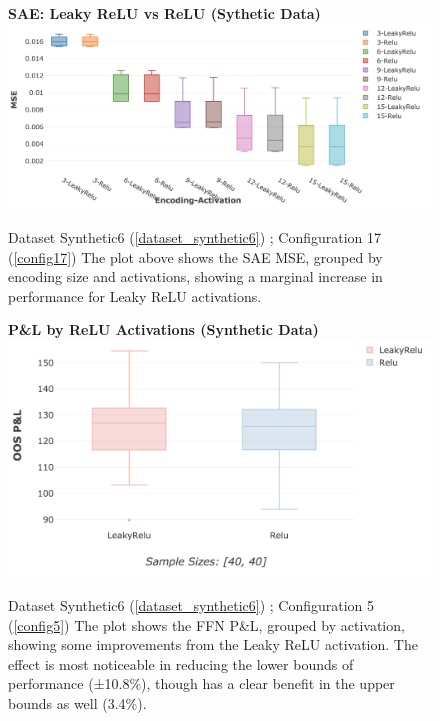 \documentclass[a4paper,11pt,oneside]{article}
\theoremstyle{plain}
\theoremstyle{definition}
\begin{document}
	\begin{figure}[H]
		\centering 
		\textbf{SAE: Leaky ReLU vs ReLU (Sythetic Data)} 
		\includegraphics[scale=0.4]{images/results/8_appendix/synthetic_mse_leakyrelu.png}
		\caption[SAE: Leaky ReLU vs. ReLU (Synthetic Data)]{Dataset Synthetic6  (\ref{dataset_synthetic6}) ; Configuration 17 (\ref{config17})
			\newline The plot above shows the SAE MSE, grouped by encoding size and activations, showing a marginal increase in performance for Leaky ReLU activations. }
		\label{figure-synthetic_mse_leakyrelu}
	\end{figure}
	
	\begin{figure}[H]
		\textbf{P\&L by ReLU Activations (Synthetic Data)}
		\centering
		\includegraphics[scale=0.4]{images/results/8_appendix/synthetic_pl_leakyrelu.png}
		\caption[P\&L by ReLU Activations (Synthetic Data)]{Dataset Synthetic6  (\ref{dataset_synthetic6}) ; Configuration 5 (\ref{config5})
			\newline The plot shows the FFN P\&L, grouped by activation, showing some improvements from the Leaky ReLU activation. The effect is most noticeable in reducing the lower bounds of performance (±10.8\%), though has a clear benefit in the upper bounds as well (3.4\%).}
		\label{figure-synthetic_pl_leakyrelu}
	\end{figure}
	
\end{document}
